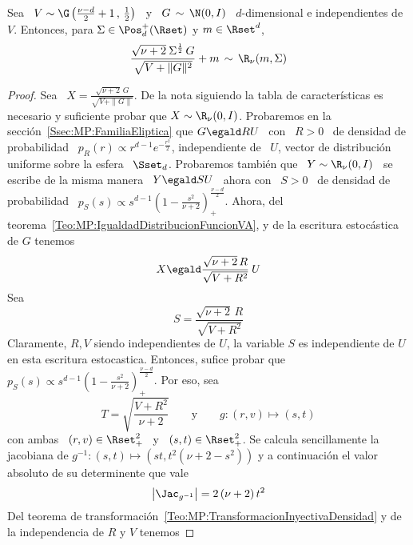 %
\begin{lema}\label{Lem:MP:StudentRGamma}
%
  Sea \ $V \sim \G\left( \frac{\nu-d}{2}+1 \,  , \, \frac12 \right)$ \ y \ $G \,
  \sim \,  \N(0,I)$ \  $d$-dimensional e independientes  de $V$.  Entonces, para
  $\Sigma \in \Pos_d^+(\Rset)$ y $m \in \Rset^d$,
  \[
  \frac{\sqrt{\nu+2} \:  \Sigma^{\frac12} \, G}{\sqrt{V  + \|G\|^2}} + m \,  \sim \,
  \R_\nu( m , \Sigma )
  \]
\end{lema}
\begin{proof}
  Sea \ $X = \frac{\sqrt{\nu+2} \,  G}{\sqrt{V + \|G\|}}$.  De la nota siguiendo
  la tabla  de caracter\'isticas  es necesario y  suficiente probar que  $X \sim
  \R_\nu(0,I)$.  Probaremos en la secci\'on~\ref{Ssec:MP:FamiliaEliptica} que $G
  \egald R U$  \ con \ $R >  0$ \ de densidad de probabilidad  \ $p_R(r) \propto
  r^{d-1} e^{-\frac{r^2}{2}}$, independiente de  \ $U$, vector de distribuci\'on
  uniforme  sobre la esfera  \ $\Sset_d$.   Probaremos tambi\'en  que \  $Y \sim
  \R_\nu(0,I)$ \ se escribe de la misma manera \ $Y \egald S U$ \ ahora con \ $S
  >  0$ \  de densidad  de probabilidad  \ $p_S(s)  \propto s^{d-1}  \left(  1 -
    \frac{s^2}{\nu+2}       \right)_+^{\frac{\nu-d}{2}}$.        Ahora,      del
  teorema~\ref{Teo:MP:IgualdadDistribucionFuncionVA},   y    de   la   escritura
  estoc\'astica de $G$ tenemos
  \[
  X \egald \frac{\sqrt{\nu+2} \, R}{\sqrt{V + R^2}} \: U
  \]
  Sea
  \[
  S = \frac{\sqrt{\nu+2} \, R}{\sqrt{V + R^2}}
  \]
  Claramente,  $R,  V$  siendo  independientes   de  $U$,  la  variable  $S$  es
  independiente de  $U$ en esta  escritura estocastica. Entonces,  sufice probar
  que    $p_S(s)    \propto     s^{d-1}    \left(    1    -    \frac{s^2}{\nu+2}
  \right)_+^{\frac{\nu-d}{2}}$. Por eso, sea
  \[
  T = \sqrt{\frac{V+R^2}{\nu+2}} \qquad \mbox{y} \qquad g: (r,v) \mapsto (s,t)
  \]
  con ambas  \ $(r,v) \in  \Rset_+^2$ \ y  \ $(s,t) \in \Rset_+^2$.   Se calcula
  sencillamente  la  jacobiana  de $g^{-1}:  (s,t)  \mapsto  \left(  s t  ,  t^2
    (\nu+2-s^2) \right)$ y a continuaci\'on el valor absoluto de su determinente
  que vale
  \[
  \left| \Jac_{g^{-1}} \right| = 2 \, (\nu+2) \, t^2
  \]
  Del teorema de transformaci\'on~\ref{Teo:MP:TransformacionInyectivaDensidad} y
  de la independencia de $R$ y $V$ tenemos

\end{proof}
